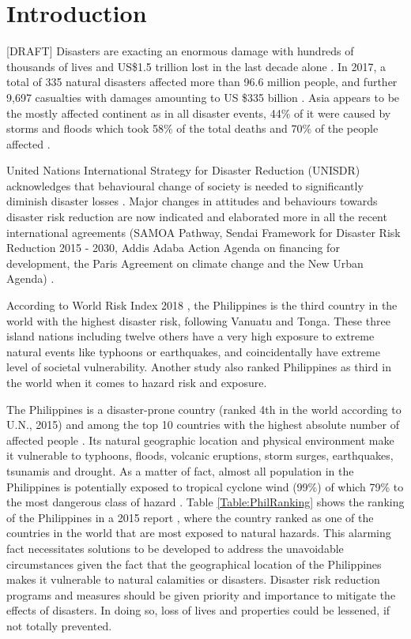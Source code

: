 \documentclass[runningheads]{llncs}
\begin{document}
\section{Introduction}
[DRAFT] Disasters are exacting an enormous damage with hundreds of thousands of lives and US\$1.5 trillion lost in the last decade alone \cite{unisdr2015report}. In 2017, a total of 335 natural disasters affected more than 96.6 million people, and further 9,697 casualties with damages amounting to US \$335 billion \cite{annualdisasterstatisticalreview2017}. Asia appears to be the mostly affected continent as in all disaster events, 44\% of it were caused by storms and floods which took 58\% of the total deaths and 70\% of the people affected \cite{annualdisasterstatisticalreview2017}. 

 United Nations International Strategy for Disaster Reduction (UNISDR) acknowledges that behavioural change of society is needed to significantly diminish disaster losses \cite{unisdr2016framework}. Major changes in attitudes and behaviours towards disaster risk reduction are now indicated and elaborated more in all the recent international agreements (SAMOA Pathway, Sendai Framework for Disaster Risk Reduction 2015 - 2030, Addis Adaba Action Agenda on financing for development, the Paris Agreement on climate change and the New Urban Agenda) \cite{unisdr2016framework}. 
 
 According to World Risk Index 2018 \cite{worldriskreport2018}, the Philippines is the third country in the world with the highest disaster risk, following Vanuatu and Tonga. These three island nations including twelve others have a very high exposure to extreme natural events like typhoons or earthquakes, and coincidentally have extreme level of societal vulnerability. Another study \cite{inform2019} also ranked Philippines as third in the world when it comes to hazard risk and exposure.

The Philippines is a disaster-prone country (ranked 4th in the world according to U.N., 2015) and among the top 10 countries with the highest absolute number of affected people \cite{humanCost}. Its natural geographic location and physical environment make it vulnerable to typhoons, floods, volcanic eruptions, storm surges, earthquakes, tsunamis and drought. As a matter of fact, almost all population in the Philippines is potentially exposed to tropical cyclone wind (99\%) of which 79\% to the most dangerous class of hazard \cite{pesaresi2017atlas}. Table \ref{Table:PhilRanking} shows the ranking of the Philippines in a 2015 report  \cite{pesaresi2017atlas}, where the country ranked as one of the countries in the world that are most exposed to natural hazards. This alarming fact necessitates solutions to be developed to address the unavoidable circumstances given the fact that the geographical location of the Philippines makes it vulnerable to natural calamities or disasters. Disaster risk reduction programs and measures should be given priority and importance to mitigate the effects of disasters. In doing so, loss of lives and properties could be lessened, if not totally prevented. 
\end{document}
